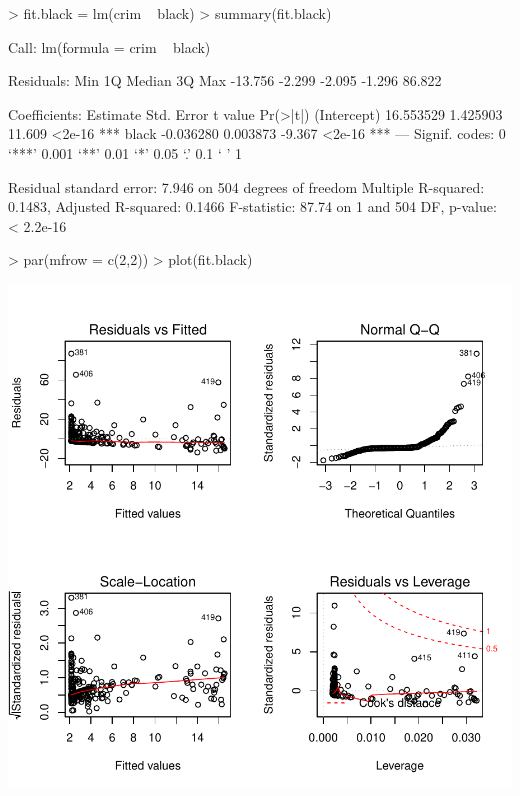 \documentclass[a4paper]{article}
\begin{document}
\begin{Schunk}
\begin{Sinput}
> fit.black = lm(crim ~ black)
> summary(fit.black)
\end{Sinput}
\begin{Soutput}
Call:
lm(formula = crim ~ black)

Residuals:
    Min      1Q  Median      3Q     Max 
-13.756  -2.299  -2.095  -1.296  86.822 

Coefficients:
             Estimate Std. Error t value Pr(>|t|)    
(Intercept) 16.553529   1.425903  11.609   <2e-16 ***
black       -0.036280   0.003873  -9.367   <2e-16 ***
---
Signif. codes:  0 ‘***’ 0.001 ‘**’ 0.01 ‘*’ 0.05 ‘.’ 0.1 ‘ ’ 1

Residual standard error: 7.946 on 504 degrees of freedom
Multiple R-squared:  0.1483,	Adjusted R-squared:  0.1466 
F-statistic: 87.74 on 1 and 504 DF,  p-value: < 2.2e-16
\end{Soutput}
\begin{Sinput}
> par(mfrow = c(2,2))
> plot(fit.black)
\end{Sinput}
\end{Schunk}
\includegraphics{mutivariblelm-black}
\end{document}
